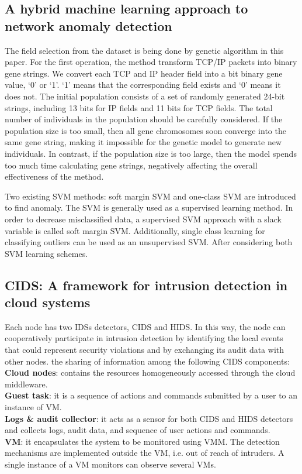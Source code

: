 \documentclass[a4paper, 12pt]{article}
\begin{document}
\subsection{A hybrid machine learning approach to network
anomaly detection}
\hspace{1cm} The field selection from the dataset is being done by genetic algorithm in this paper. 
For the first operation, the method transform TCP/IP packets into binary gene strings. We convert each TCP and IP
header field into a bit binary gene value, ‘0’ or ‘1’. ‘1’ means that the corresponding field exists and ‘0’ means it
does not. The initial population consists of a set of randomly generated 24-bit strings, including 13 bits for IP
fields and 11 bits for TCP fields. The total number of individuals in the population should be carefully considered.
If the population size is too small, then all gene chromosomes soon converge into the same gene
string, making it impossible for the genetic model to generate new individuals. In contrast, if the population
size is too large, then the model spends too much time calculating gene strings, negatively affecting the overall
effectiveness of the method.
\par Two existing SVM methods: soft margin SVM and one-class SVM are introduced to find anomaly. The SVM is generally used as a supervised learning method. In order to decrease misclassified data, a supervised SVM approach with a slack variable is called soft margin SVM. Additionally, single class learning for classifying outliers can be used as an unsupervised SVM. After considering both SVM learning schemes.

\subsection{CIDS: A framework for intrusion detection
in cloud systems}
\hspace{1cm}  
Each node has two IDSs detectors, CIDS and HIDS. In this way, the node can cooperatively participate in intrusion detection by identifying the local events that could represent security violations and by exchanging its audit data with other nodes.
the sharing of information among the following CIDS components:
\textbf{Cloud nodes}: contains the resources homogeneously accessed through the cloud middleware.\\
\textbf{Guest task}: it is a sequence of actions and commands submitted by a user to an instance of VM.\\
\textbf{Logs & audit collector}: it acts as a sensor for both CIDS and HIDS detectors and collects logs, audit data, and sequence of user actions and commands.\\
\textbf{VM}: it encapsulates the system to be monitored using VMM. The detection mechanisms are implemented outside the VM, i.e. out of reach of intruders. A single instance of a VM monitors can observe several VMs.
\end{document}
